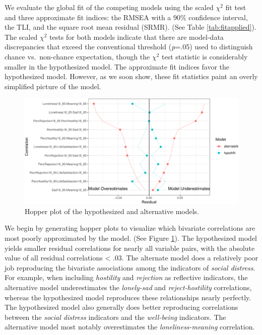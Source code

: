 \documentclass[
  english,
  man]{apa6}
\begin{document}
We evaluate the global fit of the competing models using the scaled \(\chi^2\) fit test and three approximate fit indices: the RMSEA with a 90\% confidence interval, the TLI, and the square root mean residual (SRMR). (See Table \ref{tab:fitapplied}). The scaled \(\chi^2\) tests for both models indicate that there are model-data discrepancies that exceed the conventional threshold (\emph{p}=.05) used to distinguish chance vs.~non-chance expectation, though the \(\chi^2\) test statistic is considerably smaller in the hypothesized model. The approximate fit indices favor the hypothesized model. However, as we soon show, these fit statistics paint an overly simplified picture of the model.

\begin{figure}

{\centering \includegraphics[width=0.7\linewidth]{flexplavaan_draft_files/figure-latex/hopperreal-1} 

}

\caption{Hopper plot of the hypothesized and alternative models.}\label{fig:hopperreal}
\end{figure}

We begin by generating hopper plots to visualize which bivariate correlations are most poorly approximated by the model. (See Figure \ref{fig:hopperreal}). The hypothesized model yields smaller residual correlations for nearly all variable pairs, with the absolute value of all residual correlations \textless{} .03. The alternate model does a relatively poor job reproducing the bivariate associations among the indicators of \emph{social distress}. For example, when including \emph{hostility} and \emph{rejection} as reflective indicators, the alternative model underestimates the \emph{lonely-sad} and \emph{reject-hostility} correlations, whereas the hypothesized model reproduces these relationships nearly perfectly. The hypothesized model also generally does better reproducing correlations between the \emph{social distress} indicators and the \emph{well-being} indicators. The alternative model most notably overestimates the \emph{loneliness-meaning} correlation.
\end{document}

